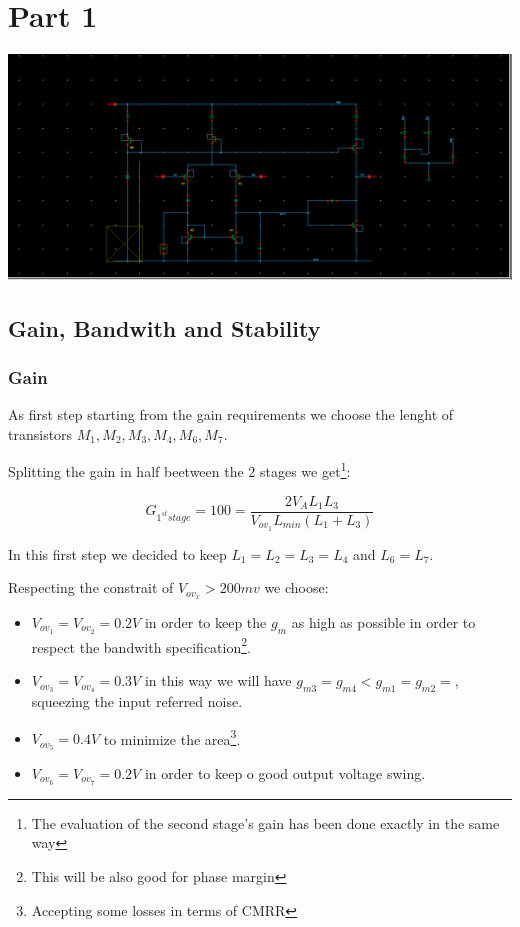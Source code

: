 \chapter{Part 1} %
\label{cha:part_1}

\centering
\includegraphics[width=1\textwidth]{Capitoli/whole.png}
\raggedright


\section{Gain, Bandwith and Stability} %
\label{sec:gain_and_bandwith}

\subsection{Gain} %
\label{subsec:gain}



As first step starting from the gain requirements we choose the lenght of transistors $M_1,M_2,M_3,M_4,M_6,M_7.$

Splitting the gain in half beetween the 2 stages we get\footnote{The evaluation of the second stage's gain has been done exactly in the same way}:

\begin{equation}
	G_{1^{st} stage} = 100 = \frac{2V_AL_1L_3}{V_{ov_1}L_{min}(L_1+L_3)}
\end{equation}


In this first step we decided to keep $L_1=L_2=L_3=L_4$ and $L_6=L_7$.

Respecting the constrait of $V_{ov_x} > 200mv$ we choose:

\begin{itemize}
	\item $V_{ov_1}=V_{ov_2}= 0.2V$ in order to keep the $g_m$ as high as possible in order to respect the bandwith specification\footnote{This will be also good for phase margin}.
	\item $V_{ov_3}=V_{ov_4}= 0.3V$ in this way we will have $g_{m3}=g_{m4}<g_{m1}=g_{m2}=$, squeezing the input referred noise.
	\item $V_{ov_5}= 0.4V$ to minimize the area\footnote{Accepting some losses in terms of CMRR}.
	\item $V_{ov_6}=V_{ov_7}= 0.2V$ in order to keep o good output voltage swing. 
\end{itemize}

